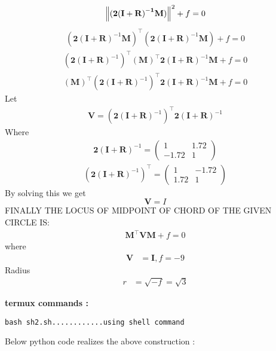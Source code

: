 \documentclass[10pt, a4paper]{article}
\newcommand{\myvec}[1]{\ensuremath{\begin{pmatrix}#1\end{pmatrix}}}
\let\vec\mathbf
\begin{document}
\begin{align}
    \norm{\vec{(\vec{2(I+R)}^{-1}\vec{M})}}^2+f = 0
\end{align}
\begin{align}
(\vec{2(I+R)}^{-1}\vec{M})^{\top}(\vec{2(I+R)}^{-1}\vec{M})+f=0
\end{align}
\begin{align}
(\vec{2(I+R)}^{-1})^{\top}(\vec{M})^{\top}\vec{2(I+R)}^{-1}\vec{M}+f=0
\end{align}
\begin{align}
(\vec{M})^{\top}(\vec{2(I+R)}^{-1})^{\top}\vec{2(I+R)}^{-1}\vec{M}+f=0
\end{align}
Let
\begin{align}
\vec{V}=(\vec{2(I+R)}^{-1})^{\top}\vec{2(I+R)}^{-1}
\end{align}
Where
\begin{align}
\vec{2(I+R)}^{-1}=\myvec{1 & 1.72 \\-1.72 & 1}
\end{align}
\begin{align}
(\vec{2(I+R)}^{-1})^{\top}=\myvec{1 & -1.72 \\1.72 & 1}
\end{align}
By solving this we get
\begin{equation}
\vec{V}=I
\end{equation}
FINALLY THE LOCUS OF MIDPOINT OF CHORD OF THE GIVEN CIRCLE IS:
\begin{align}
\vec{M}^{\top}\vec{V}\vec{M}+f=0
\end{align}
where 
\begin{align}
	\vec{V} &= \vec{I}, f = -9
	\end{align}
Radius 
	\begin{align}
	r &=\sqrt{-f }=\sqrt{3}
    \end{align}

\textbf{termux commands :}
\begin{lstlisting}
bash sh2.sh............using shell command
\end{lstlisting}
\begin{center}
Below python code realizes the above construction :
\end{center}
\end{document}
